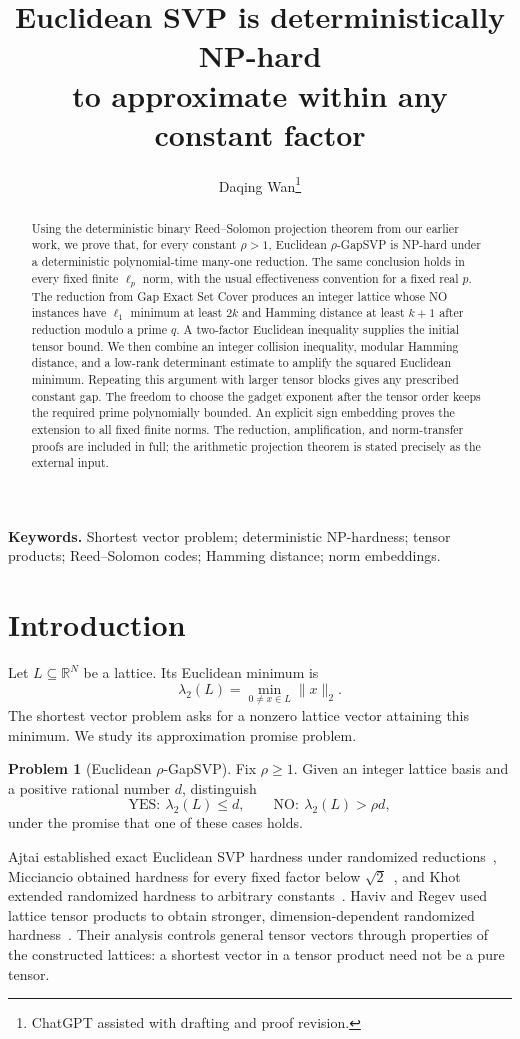 \documentclass[11pt,letterpaper]{article}
\title{\textbf{Euclidean SVP is deterministically NP-hard\\
to approximate within any constant factor}}
\author{Daqing Wan\thanks{ChatGPT assisted with drafting and proof revision.}}
\date{}
\numberwithin{equation}{section}
\theoremstyle{definition}
\newtheorem{problem}[theorem]{Problem}
\theoremstyle{remark}
\newcommand{\R}{\mathbb R}
\newcommand{\YES}{\mathrm{YES}}
\newcommand{\NO}{\mathrm{NO}}
\begin{document}
\maketitle
\begin{abstract}
Using the deterministic binary Reed--Solomon projection theorem from our earlier work, we prove that, for every constant $\rho>1$, Euclidean $\rho$-GapSVP is NP-hard under a deterministic polynomial-time many-one reduction. The same conclusion holds in every fixed finite $\ell_p$ norm, with the usual effectiveness convention for a fixed real $p$. The reduction from Gap Exact Set Cover produces an integer lattice whose NO instances have $\ell_1$ minimum at least $2k$ and Hamming distance at least $k+1$ after reduction modulo a prime $q$. A two-factor Euclidean inequality supplies the initial tensor bound. We then combine an integer collision inequality, modular Hamming distance, and a low-rank determinant estimate to amplify the squared Euclidean minimum. Repeating this argument with larger tensor blocks gives any prescribed constant gap. The freedom to choose the gadget exponent after the tensor order keeps the required prime polynomially bounded. An explicit sign embedding proves the extension to all fixed finite norms. The reduction, amplification, and norm-transfer proofs are included in full; the arithmetic projection theorem is stated precisely as the external input.
\end{abstract}
\noindent\textbf{Keywords.} Shortest vector problem; deterministic NP-hardness; tensor products; Reed--Solomon codes; Hamming distance; norm embeddings.

\section{Introduction}
Let $L\subseteq\R^N$ be a lattice. Its Euclidean minimum is
\[
 \lambda_2(L)=\min_{0\ne x\in L}\|x\|_2.
\]
The shortest vector problem asks for a nonzero lattice vector attaining this minimum. We study its approximation promise problem.

\begin{problem}[Euclidean $\rho$-GapSVP]\label{prob:svp}
Fix $\rho\ge1$. Given an integer lattice basis and a positive rational number $d$, distinguish
\[
 \YES:\ \lambda_2(L)\le d,
 \qquad
 \NO:\ \lambda_2(L)>\rho d,
\]
under the promise that one of these cases holds.
\end{problem}

Ajtai established exact Euclidean SVP hardness under randomized reductions~\cite{ajtai}, Micciancio obtained hardness for every fixed factor below $\sqrt2$~\cite{mic01}, and Khot extended randomized hardness to arbitrary constants~\cite{khot}. Haviv and Regev used lattice tensor products to obtain stronger, dimension-dependent randomized hardness~\cite{hr}. Their analysis controls general tensor vectors through properties of the constructed lattices: a shortest vector in a tensor product need not be a pure tensor.
\end{document}
